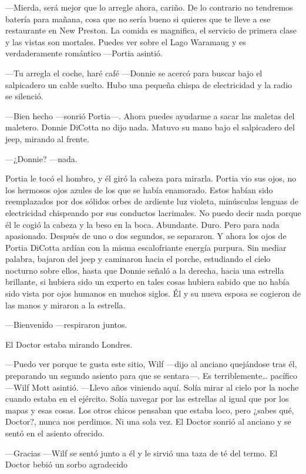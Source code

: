---Mierda, será mejor que lo arregle ahora, cariño. De lo contrario no
tendremos batería para mañana, cosa que no sería bueno si quieres que te
lleve a ese restaurante en New Preston. La comida es magnifica, el
servicio de primera clase y las vistas son mortales. Puedes ver sobre el
Lago Waramaug y es verdaderamente romántico ---Portia asintió.

---Tu arregla el coche, haré café ---Donnie se acercó para buscar bajo
el salpicadero un cable suelto. Hubo una pequeña chispa de electricidad
y la radio se silenció.

---Bien hecho ---sonrió Portia---. Ahora puedes ayudarme a sacar las
maletas del maletero. Donnie DiCotta no dijo nada. Matuvo su mano bajo
el salpicadero del jeep, mirando al frente.

---¿Donnie? ---nada.

Portia le tocó el hombro, y él giró la cabeza para mirarla. Portia vio
sus ojos, no los hermosos ojos azules de los que se había enamorado.
Estos habían sido reemplazados por dos sólidos orbes de ardiente luz
violeta, minúsculas lenguas de electricidad chispeando por sus conductos
lacrimales. No puedo decir nada porque él le cogió la cabeza y la beso
en la boca. Abundante. Duro. Pero para nada apasionado. Después de uno o
dos segundos, se separaron. Y ahora los ojos de Portia DiCotta ardían
con la misma escalofriante energía purpura. Sin mediar palabra, bajaron
del jeep y caminaron hacia el porche, estudiando el cielo nocturno sobre
ellos, hasta que Donnie señaló a la derecha, hacia una estrella
brillante, si hubiera sido un experto en tales cosas hubiera sabido que
no había sido vista por ojos humanos en muchos siglos. Él y su nueva
esposa se cogieron de las manos y miraron a la estrella.

---Bienvenido ---respiraron juntos.

El Doctor estaba mirando Londres.

---Puedo ver porque te gusta este sitio, Wilf ---dijo al anciano
quejándose tras él, preparando un segundo asiento para que se
sentara---. Es terriblemente\ldots{} pacífico ---Wilf Mott asintió.
---Llevo años viniendo aquí. Solía mirar al cielo por la noche cuando
estaba en el ejército. Solía navegar por las estrellas al igual que por
los mapas y esas cosas. Los otros chicos pensaban que estaba loco, pero
¿sabes qué, Doctor?, nunca nos perdimos. Ni una sola vez. El Doctor
sonrió al anciano y se sentó en el asiento ofrecido.

---Gracias ---Wilf se sentó junto a él y le sirvió una taza de té del
termo. El Doctor bebió un sorbo agradecido

